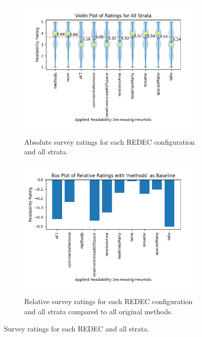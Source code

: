 \documentclass[%
class=scrreprt,
chapterprefix=false,%
open=right,%
twoside=false,%
paper=a4,%
logofile={Logo\_zentral\_farbig\_EN.png},%
thesistype=master,%
UKenglish,%
]{se2thesis}
\theoremstyle{definition}
\newcommand{\rdh}{REDEC\xspace}
\begin{document}
	\begin{figure}[p]
		\centering
		\begin{subfigure}{\linewidth}
			\includegraphics[width=\textwidth]{img/survey_ratings_violin_all.png}
			\caption{Absolute survey ratings for each \rdh configuration and all strata.}
			\label{fig:survey_ratings_violin_all}
		\end{subfigure}
		\hfill
		\begin{subfigure}{\textwidth}
			\includegraphics[width=\linewidth]{img/survey_ratings_bar_all.png}
			\caption{Relative survey ratings for each \rdh configuration and all strata compared to all original methods.}
			\label{fig:survey_ratings_bar_all}
		\end{subfigure}
		\caption{Survey ratings for each \rdh and all strata.}
		\label{fig:survey_time_all}
	\end{figure}
	
\end{document}
